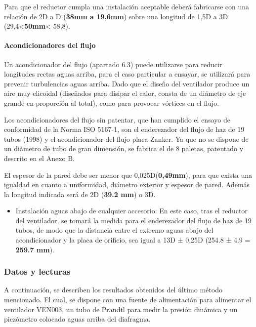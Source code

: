 Para que el reductor cumpla una instalación aceptable deberá fabricarse
con una relación de 2D a D (\textbf{38mm a 19,6mm}) sobre una longitud
de 1,5D a 3D (29,4\textless{}\textbf{50mm}\textless{} 58,8).

\paragraph{Acondicionadores del flujo}\label{header-n332}

Un acondicionador del flujo (apartado 6.3) puede utilizarse para reducir
longitudes rectas aguas arriba, para el caso particular a ensayar, se
utilizará para prevenir turbulencias aguas arriba. Dado que el diseño
del ventilador produce un aire muy elicoidal (diseñados para disipar el
calor, consta de un diámetro de eje grande en proporción al total), como
para provocar vórtices en el flujo.

Los acondicionadores del flujo sin patentar, que han cumplido el ensayo
de conformidad de la Norma ISO 5167-1, son el enderezador del flujo de
haz de 19 tubos (1998) y el acondicionador del flujo placa Zanker. Ya
que no se dispone de un diámetro de tubo de gran dimensión, se fabrica
el de 8 paletas, patentado y descrito en el Anexo B.

El espesor de la pared debe ser menor que 0,025D(\textbf{0,49mm}), para
que exista una igualdad en cuanto a uniformidad, diámetro exterior y
espesor de pared. Además la longitud indicada será de 2D (\textbf{39.2
mm}) o 3D.

\begin{itemize}
\item
  Instalación aguas abajo de cualquier accesorio: En este caso, tras el
  reductor del ventilador, se tomará la medida para el enderezador del
  flujo de haz de 19 tubos, de modo que la distancia entre el extremo
  aguas abajo del acondicionador y la placa de orificio, sea igual a 13D
  ± 0,25D (254.8 ± 4.9 = \textbf{259.7 mm}).
\end{itemize}

\subsubsection{Datos y lecturas}\label{header-n345}

A continuación, se describen los resultados obtenidos del último método
mencionado. El cual, se dispone con una fuente de alimentación para
alimentar el ventilador VEN003, un tubo de Prandtl para medir la presión
dinámica y un piezómetro colocado aguas arriba del diafragma.

